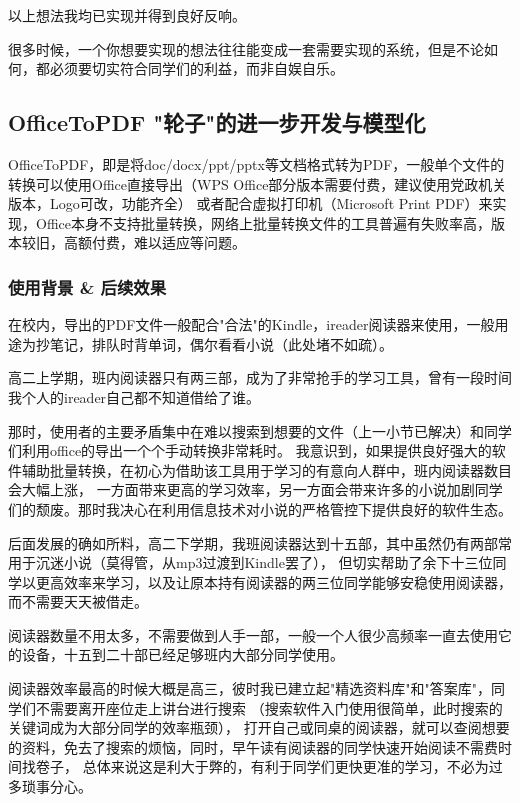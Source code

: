 \documentclass{article}
\begin{document}
        以上想法我均已实现并得到良好反响。

        很多时候，一个你想要实现的想法往往能变成一套需要实现的系统，但是不论如何，都必须要切实符合同学们的利益，而非自娱自乐。
    \newpage

    \subsection{OfficeToPDF "轮子"的进一步开发与模型化}
        OfficeToPDF，即是将doc/docx/ppt/pptx等文档格式转为PDF，一般单个文件的转换可以使用Office直接导出（WPS Office部分版本需要付费，建议使用党政机关版本，Logo可改，功能齐全）
        或者配合虚拟打印机（Microsoft Print PDF）来实现，Office本身不支持批量转换，网络上批量转换文件的工具普遍有失败率高，版本较旧，高额付费，难以适应等问题。

        \subsubsection{使用背景 \& 后续效果}
        在校内，导出的PDF文件一般配合"合法"的Kindle，ireader阅读器来使用，一般用途为抄笔记，排队时背单词，偶尔看看小说（此处堵不如疏）。

        高二上学期，班内阅读器只有两三部，成为了非常抢手的学习工具，曾有一段时间我个人的ireader自己都不知道借给了谁。

        那时，使用者的主要矛盾集中在难以搜索到想要的文件（上一小节已解决）和同学们利用office的导出一个个手动转换非常耗时。
        我意识到，如果提供良好强大的软件辅助批量转换，在初心为借助该工具用于学习的有意向人群中，班内阅读器数目会大幅上涨，
        一方面带来更高的学习效率，另一方面会带来许多的小说加剧同学们的颓废。那时我决心在利用信息技术对小说的严格管控下提供良好的软件生态。

        后面发展的确如所料，高二下学期，我班阅读器达到十五部，其中虽然仍有两部常用于沉迷小说（莫得管，从mp3过渡到Kindle罢了），
        但切实帮助了余下十三位同学以更高效率来学习，以及让原本持有阅读器的两三位同学能够安稳使用阅读器，而不需要天天被借走。
        
        阅读器数量不用太多，不需要做到人手一部，一般一个人很少高频率一直去使用它的设备，十五到二十部已经足够班内大部分同学使用。

        阅读器效率最高的时候大概是高三，彼时我已建立起"精选资料库"和"答案库"，同学们不需要离开座位走上讲台进行搜索
        （搜索软件入门使用很简单，此时搜索的关键词成为大部分同学的效率瓶颈），
        打开自己或同桌的阅读器，就可以查阅想要的资料，免去了搜索的烦恼，同时，早午读有阅读器的同学快速开始阅读不需费时间找卷子，
        总体来说这是利大于弊的，有利于同学们更快更准的学习，不必为过多琐事分心。
\end{document}
